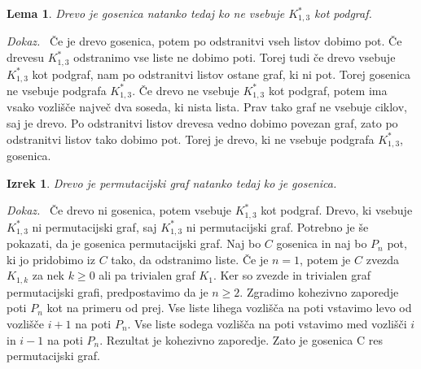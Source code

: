 \documentclass[a4paper, 12pt]{book}
\newtheorem{lema}{Lema}[chapter]
\newtheorem{izrek}{Izrek}[chapter]
\newenvironment{dokaz}{\emph{Dokaz.}\ }{\hspace{\fill}{$\Box$}}
\begin{document}
\begin{lema}
    Drevo je gosenica natanko tedaj ko ne vsebuje $K_{1,3}^*$ kot podgraf.
\end{lema}
\begin{dokaz}
    Če je drevo gosenica, potem po odstranitvi vseh listov dobimo pot. Če drevesu $K_{1,3}^*$ odstranimo vse liste ne dobimo poti. Torej tudi če drevo vsebuje $K_{1,3}^*$ kot podgraf, nam po odstranitvi listov ostane graf, ki ni pot. Torej gosenica ne vsebuje podgrafa $K_{1,3}^*$. Če drevo ne vsebuje $K_{1,3}^*$ kot podgraf, potem ima vsako vozlišče največ dva soseda, ki nista lista. Prav tako graf ne vsebuje ciklov, saj je drevo. Po odstranitvi listov drevesa vedno dobimo povezan graf, zato po odstranitvi listov tako dobimo pot. Torej je drevo, ki ne vsebuje podgrafa $K_{1,3}^*$, gosenica.
\end{dokaz}

\begin{izrek}
\label{izrek_gosenica_permutacijski_graf}
    Drevo je permutacijski graf natanko tedaj ko je gosenica.
\end{izrek}
\begin{dokaz}
    Če drevo ni gosenica, potem vsebuje $K_{1,3}^*$ kot podgraf. Drevo, ki vsebuje $K_{1,3}^*$ ni permutacijski graf, saj $K_{1,3}^*$ ni permutacijski graf. Potrebno je še pokazati, da je gosenica permutacijski graf. Naj bo $C$ gosenica in naj bo $P_n$ pot, ki jo pridobimo iz $C$ tako, da odstranimo liste. Če je $n=1$, potem je $C$ zvezda $K_{1,k}$ za nek $k \geq 0$ ali pa trivialen graf $K_1$. Ker so zvezde in trivialen graf permutacijski grafi, predpostavimo da je $n \geq 2$. Zgradimo kohezivno zaporedje poti $P_n$ kot na primeru od prej. Vse liste lihega vozlišča na poti vstavimo levo od vozlišče $i+1$ na poti $P_n$. Vse liste sodega vozlišča na poti vstavimo med vozlišči $i$ in $i-1$ na poti $P_n$. Rezultat je kohezivno zaporedje. Zato je gosenica C res permutacijski graf.
\end{dokaz}
\end{document}
